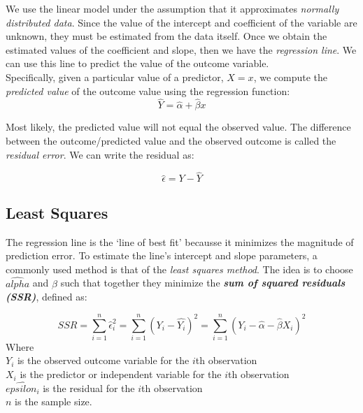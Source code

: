\documentclass{article}
\begin{document}
    \noindent We use the linear model under the assumption that it
approximates \textit{normally distributed data}. Since the value of the
intercept and coefficient of the variable are unknown, they must be
estimated from the data itself. Once we obtain the estimated values of the
coefficient and slope, then we have the \textit{regression line}. We can use
this line to predict the value of the outcome variable.\\

    \noindent Specifically, given a particular value of a predictor, $X = x$, we compute the \textit{predicted value} of the outcome value using the regression function:\\

    \[
        \hat{Y} = \hat{\alpha} + \hat{\beta}x
    \]

    Most likely, the predicted value will not equal the observed value. The
    difference between the outcome/predicted value and the observed outcome
    is called the \textit{residual error}. We can write the residual as:

    \[
        \hat{\epsilon} = Y - \hat{Y}
    \]


    \subsection{Least Squares}

    \noindent The regression line is the `line of best fit' becausse it
minimizes the magnitude of prediction error. To estimate the line's
intercept and slope parameters, a commonly used method is that of the \textit{least squares method}. The idea is to choose $\hat{alpha}$ and $\hat{\beta}$ such that together they minimize the \textit{\textbf{sum of squared residuals (SSR)}}, defined as:

    \[
        SSR = \sum^{n}_{i=1}\hat{\epsilon}^{2}_{i}
            = \sum^{n}_{i=1}(Y_i - \hat{Y_i})^2
            = \sum^{n}_{i=1}(Y_i - \hat{\alpha} - \hat{\beta}X_i)^2
    \]
    \indent Where \\
    \indent \indent $Y_i$ is the observed outcome variable for the $i$th observation \\
    \indent \indent $X_i$ is the predictor or independent variable for the $i$th observation \\
    \indent \indent $\hat{epsilon_i}$ is the residual for the $i$th
observation \\
    \indent \indent $n$ is the sample size.\\
\end{document}
